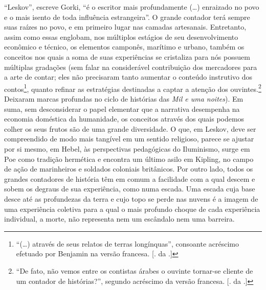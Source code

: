 ``Leskov'', escreve Gorki, ``é o escritor mais profundamente (\ldots{})
enraizado no povo e o mais isento de toda influência estrangeira''. O
grande contador terá sempre suas raízes no povo, e em primeiro lugar nas
camadas artesanais. Entretanto, assim como essas englobam, nos múltiplos
estágios de seu desenvolvimento econômico e técnico, os elementos
camponês, marítimo e urbano, também os conceitos nos quais a soma de
suas experiências se cristaliza para nós possuem múltiplas gradações 
(sem falar na considerável contribuição dos mercadores para a arte de
contar; eles não precisaram tanto aumentar o conteúdo instrutivo dos
contos\footnote{``(\ldots{}) através de seus relatos de terras longínquas'',
  consoante acréscimo efetuado por Benjamin na versão francesa. [. da
  .]}, quanto refinar as estratégias destinadas a captar a atenção
dos ouvintes.\footnote{``De fato, não vemos entre os contistas árabes o
  ouvinte tornar-se cliente de um contador de histórias?'', segundo
  acréscimo da versão francesa. [. da .]} Deixaram marcas
profundas no ciclo de histórias das \emph{Mil e uma noites}). Em suma,
sem desconsiderar o papel elementar que a narrativa desempenha na
economia doméstica da humanidade, os conceitos através dos quais podemos
colher os seus frutos são de uma grande diversidade. O que, em Leskov,
deve ser compreendido de modo mais tangível em um sentido religioso,
parece se ajustar por si mesmo, em Hebel, às perspectivas pedagógicas do
Iluminismo, surge em Poe como tradição hermética e encontra um último
asilo em Kipling, no campo de ação de marinheiros e soldados coloniais
britânicos. Por outro lado, todos os grandes contadores de história têm
em comum a facilidade com a qual descem e sobem os degraus de sua
experiência, como numa escada. Uma escada cuja base desce até as
profundezas da terra e cujo topo se perde nas nuvens é a imagem de uma
experiência coletiva para a qual o mais profundo choque de cada
experiência individual, a morte, não representa nem um escândalo nem uma
barreira.

